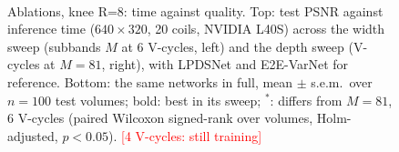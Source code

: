 \documentclass[10pt]{article}
\newcommand{\todo}[1]{\textcolor{red}{[#1]}}
\newcommand{\figdir}{figures}
\begin{document}
\begin{figure}[h]
\centering
\\[10pt]
{\small}
\caption{Ablations, knee R=8: time against quality. Top: test PSNR against inference time
($640\times320$, 20 coils, NVIDIA L40S) across the width sweep (subbands $M$ at 6 V-cycles, left)
and the depth sweep (V-cycles at $M{=}81$, right), with LPDSNet and E2E-VarNet for reference.
Bottom: the same networks in full, mean $\pm$ s.e.m.\ over $n{=}100$ test volumes; bold: best
in its sweep; $^{*}$: differs from $M{=}81$, 6 V-cycles (paired Wilcoxon signed-rank over volumes,
Holm-adjusted, $p<0.05$). \todo{4 V-cycles: still training}}
\label{fig:ablation}
\end{figure}
\end{document}
